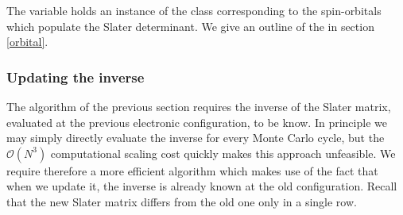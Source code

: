 \documentclass[../../master.tex]{subfiles}
\begin{document}
The  variable holds an instance of the class corresponding to the spin-orbitals which populate the Slater determinant. We give an outline of the  in section \ref{orbital}.

\subsubsection{Updating the inverse}
The algorithm of the previous section requires the inverse of the Slater matrix, evaluated at the previous electronic configuration, to be know. In principle we may simply directly evaluate the inverse for every Monte Carlo cycle, but the $\mathcal{O}(N^3)$ computational scaling cost quickly makes this approach unfeasible. We require therefore a more efficient algorithm which makes use of the fact that when we update it, the inverse is already known at the old configuration. Recall that the new Slater matrix differs from the old one only in a single row.
\end{document}
